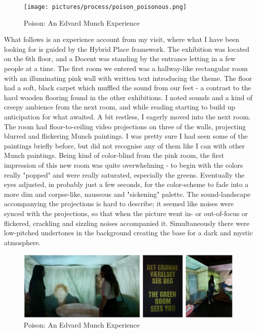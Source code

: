 \begin{figure}[H]
\texttt{[image: pictures/process/poison\_poisonous.png]}
\caption{Poison: An Edvard Munch Experience}
\centering
\end{figure}

What follows is an experience account from my visit, where what I have been looking for is guided by the Hybrid Place framework. The exhibition was located on the 6th floor, and a Docent was standing by the entrance letting in a few people at a time. The first room we entered was a hallway-like rectangular room with an illuminating pink wall with written text introducing the theme. The floor had a soft, black carpet which muffled the sound from our feet - a contrast to the hard wooden flooring found in the other exhibitions. I noted sounds and a kind of creepy ambience from the next room, and while reading starting to build up anticipation for what awaited. A bit restless, I eagerly moved into the next room. The room had floor-to-ceiling video projections on three of the walls, projecting blurred and flickering Munch paintings. I was pretty sure I had seen some of the paintings briefly before, but did not recognise any of them like I can with other Munch paintings. Being kind of color-blind from the pink room, the first impression of this new room was quite overwhelming - to begin with the colors really "popped" and were really saturated, especially the greens. Eventually the eyes adjusted, in probably just a few seconds, for the color-scheme to fade into a more dim and corpse-like, nauseous and "sickening" palette. The sound-landscape accompanying the projections is hard to describe; it seemed like noises were synced with the projections, so that when the picture went in- or out-of-focus or flickered, crackling and sizzling noises accompanied it. Simultaneously there were low-pitched undertones in the background creating the base for a dark and mystic atmosphere.

\begin{figure}[H]
\includegraphics[width=12.5cm]{pictures/process/poison_seeu.png}
\caption{Poison: An Edvard Munch Experience}
\centering
\end{figure}

